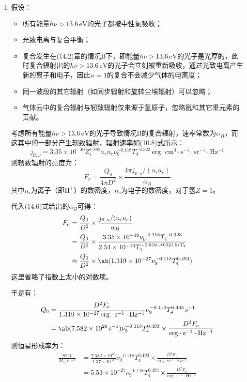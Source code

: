 \documentclass[a4paper,fontset=none]{ctexart}
\begin{document}
\begin{enumerate}
    \medskip
    \item[42.1 (b)]
    假设：
    \begin{itemize}
        \item 所有能量$h\nu > 13.6\,\mathrm{eV}$的光子都被中性氢吸收；
        \item 光致电离与复合平衡；
        \item 复合发生在(14.2)章的情况B下，即能量$h\nu > 13.6\,\mathrm{eV}$的光子是光厚的，此时复合辐射出的$h\nu > 13.6\,\mathrm{eV}$的光子会立刻被重新吸收，通过光致电离产生新的离子和电子，因此$n=1$的复合不会减少气体的电离度；
        \item 同一波段的其它辐射（如同步辐射和旋转尘埃辐射）可以忽略；
        \item 气体云中的复合辐射与轫致辐射仅来源于氢原子，忽略氦和其它重元素的贡献。
    \end{itemize}
    考虑所有能量$h\nu > 13.6\,\mathrm{eV}$的光子导致情况B的复合辐射，速率常数为$\alpha_B$，而这其中的一部分产生轫致辐射，辐射速率如(10.8)式所示：
    \[
        j_{\mathrm{ff},\nu} = 3.35 \times 10^{-40} Z_i^{1.882} n_i n_e \nu_9^{-0.118} T_4^{-0.323}\,\mathrm{erg \cdot cm^3 \cdot s^{-1} \cdot {sr}^{-1} \cdot Hz^{-1}}
    \]
    则轫致辐射的亮度为：
    \[
        F_\nu = \frac{Q_0}{4\pi D^2} \times \frac{4\pi j_{\mathrm{ff},\nu}/(n_i n_e)}{\alpha_B}
    \]
    其中$n_i$为离子（即$\mathrm{H^+}$）的数密度，$n_e$为电子的数密度，对于氢$Z = 1$。

    代入(14.6)式给出的$\alpha_B$可得：
    \begin{align*}
        F_\nu
        &= \frac{Q_0}{D^2} \times \frac{j_{\mathrm{ff},\nu}/(n_i n_e)}{\alpha_B} \\
        &= \frac{Q_0}{D^2} \times \frac{3.35 \times 10^{-40} \nu_9^{-0.118} T_4^{-0.323}}{2.54 \times 10^{-13} T_4^{-0.816-0.021\ln{T_4}}} \\
        &\approx \frac{Q_0}{D^2} \times \ab(1.319 \times 10^{-27} \nu_9^{-0.118} T_4^{0.493})
    \end{align*}
    这里省略了指数上太小的对数项。

    于是有：
    \begin{align*}
        Q_0
        &= \frac{D^2 F_\nu}{1.319 \times 10^{-27}\,\mathrm{erg \cdot s^{-1} \cdot Hz^{-1}}} \nu_9^{-0.118} T_4^{0.493}\,\mathrm{s^{-1}} \\
        &= \ab(7.582 \times 10^{26}\,\mathrm{s^{-1}}) \nu_9^{-0.118} T_4^{0.493} \times \frac{D^2 F_\nu}{\mathrm{erg \cdot s^{-1} \cdot Hz^{-1}}}
    \end{align*}
    则恒星形成率为：
    \begin{align*}
        \frac{\mathrm{SFR}}{M_\odot\,\mathrm{yr^{-1}}}
        &= \frac{7.582 \times 10^{26}}{1.37 \times 10^{53}} \nu_9^{-0.118} T_4^{0.493} \times \frac{D^2 F_\nu}{\mathrm{erg \cdot s^{-1} \cdot Hz^{-1}}} \\
        &= 5.53 \times 10^{-27} \nu_9^{-0.118} T_4^{0.493} \times \frac{D^2 F_\nu}{\mathrm{erg \cdot s^{-1} \cdot Hz^{-1}}}
    \end{align*}


\end{enumerate}
\end{document}
